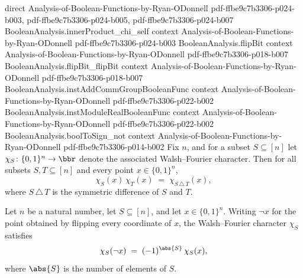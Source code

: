 \begin{lemma}
  {direct}
  {Analysis-of-Boolean-Functions-by-Ryan-ODonnell}
  {pdf-ffbe9c7b3306-p024-b003,
    pdf-ffbe9c7b3306-p024-b005,
    pdf-ffbe9c7b3306-p024-b007}
\proofstep
  {BooleanAnalysis.innerProduct_chi_self}
  {context}
  {Analysis-of-Boolean-Functions-by-Ryan-ODonnell}
  {pdf-ffbe9c7b3306-p024-b003}
\proofstep
  {BooleanAnalysis.flipBit}
  {context}
  {Analysis-of-Boolean-Functions-by-Ryan-ODonnell}
  {pdf-ffbe9c7b3306-p018-b007}
\proofstep
  {BooleanAnalysis.flipBit_flipBit}
  {context}
  {Analysis-of-Boolean-Functions-by-Ryan-ODonnell}
  {pdf-ffbe9c7b3306-p018-b007}
\proofstep
  {BooleanAnalysis.instAddCommGroupBooleanFunc}
  {context}
  {Analysis-of-Boolean-Functions-by-Ryan-ODonnell}
  {pdf-ffbe9c7b3306-p022-b002}
\proofstep
  {BooleanAnalysis.instModuleRealBooleanFunc}
  {context}
  {Analysis-of-Boolean-Functions-by-Ryan-ODonnell}
  {pdf-ffbe9c7b3306-p022-b002}
\proofstep
  {BooleanAnalysis.boolToSign_not}
  {context}
  {Analysis-of-Boolean-Functions-by-Ryan-ODonnell}
  {pdf-ffbe9c7b3306-p014-b002}
Fix $n$, and for a subset $S\subseteq[n]$ let $\chi_S\colon\{0,1\}^n\to\bbr$ denote the
associated Walsh--Fourier character. Then for all subsets $S,T\subseteq[n]$ and every
point $x\in\{0,1\}^n$,
\[
  \chi_S(x)\,\chi_T(x) \;=\; \chi_{S\,\triangle\,T}(x),
\]
where $S\,\triangle\,T$ is the symmetric difference of $S$ and $T$.
\end{lemma}

\begin{lemma}
\label{BooleanAnalysis.chiS_neg}
\leanok
{}
Let $n$ be a natural number, let $S \subseteq [n]$, and let $x \in \{0,1\}^n$. Writing
$\lnot x$ for the point obtained by flipping every coordinate of $x$, the Walsh--Fourier
character $\chi_S$ satisfies
\[
  \chi_S(\lnot x) \;=\; (-1)^{\abs{S}}\,\chi_S(x),
\]
where $\abs{S}$ is the number of elements of $S$.
\end{lemma}

